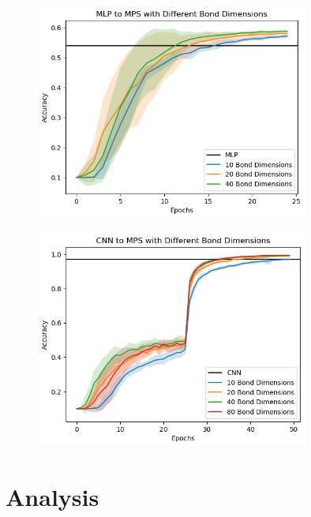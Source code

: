 \documentclass{article}
\theoremstyle{definition}
\theoremstyle{definition}
\begin{document}
\begin{figure}[H]
    \centering
    \caption{}
    \includegraphics[width=0.8\textwidth]{images/images/2023-04-21-18-13-34.png.png}
    \label{fig:MLP_to_MPS}
\end{figure}

\begin{figure}[H]
    \centering
    \caption{}
    \includegraphics[width=0.8\textwidth]{images/2023-04-21-18-13-15.png}
    \label{fig:CNN_to_MPS}
\end{figure}

\section{Analysis}
\end{document}
